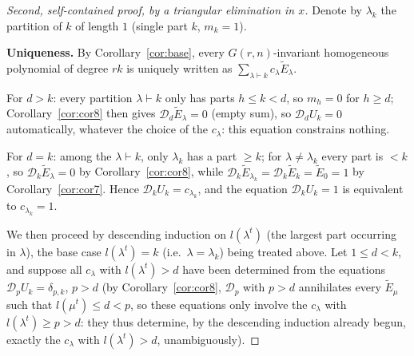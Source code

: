 \documentclass[11pt]{article}
\theoremstyle{remark}
\begin{document}
\begin{proof}[Second, self-contained proof, by a triangular elimination in $x$]
Denote by $\lambda_k$ the partition of $k$ of length $1$ (single part $k$, $m_k=1$).

\smallskip
\noindent\textbf{Uniqueness.} By Corollary~\ref{cor:base}, every $G(r,n)$-invariant homogeneous polynomial of degree $rk$ is uniquely written as $\sum_{\lambda\vdash k}c_\lambda\widetilde E_\lambda$.

For $d>k$: every partition $\lambda\vdash k$ only has parts $h\le k<d$, so $m_h=0$ for $h\ge d$; Corollary~\ref{cor:cor8} then gives $\mathcal D_d\widetilde E_\lambda=0$ (empty sum), so $\mathcal D_dU_k=0$ automatically, whatever the choice of the $c_\lambda$: this equation constrains nothing.

For $d=k$: among the $\lambda\vdash k$, only $\lambda_k$ has a part $\ge k$; for $\lambda\ne\lambda_k$ every part is $<k$, so $\mathcal D_k\widetilde E_\lambda=0$ by Corollary~\ref{cor:cor8}, while $\mathcal D_k\widetilde E_{\lambda_k}=\mathcal D_k\widetilde E_k=\widetilde E_0=1$ by Corollary~\ref{cor:cor7}. Hence $\mathcal D_kU_k=c_{\lambda_k}$, and the equation $\mathcal D_kU_k=1$ is equivalent to $c_{\lambda_k}=1$.

We then proceed by descending induction on $l(\lambda^t)$ (the largest part occurring in $\lambda$), the base case $l(\lambda^t)=k$ (i.e.\ $\lambda=\lambda_k$) being treated above. Let $1\le d<k$, and suppose all $c_\lambda$ with $l(\lambda^t)>d$ have been determined from the equations $\mathcal D_pU_k=\delta_{p,k}$, $p>d$ (by Corollary~\ref{cor:cor8}, $\mathcal D_p$ with $p>d$ annihilates every $\widetilde E_\mu$ such that $l(\mu^t)\le d<p$, so these equations only involve the $c_\lambda$ with $l(\lambda^t)\ge p>d$: they thus determine, by the descending induction already begun, exactly the $c_\lambda$ with $l(\lambda^t)>d$, unambiguously).


\end{proof}
\end{document}
